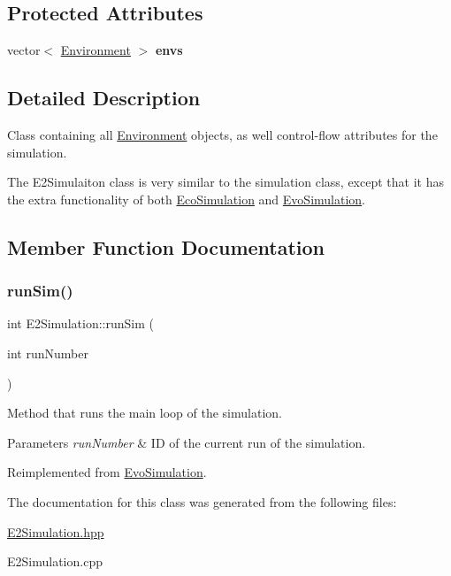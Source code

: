 \subsection*{Protected Attributes}
\begin{DoxyCompactItemize}
\item 
\mbox{\label{classE2Simulation_a72c3fa1a40648aeb904c6afb74dbb700}} 
vector$<$ \hyperlink{classEnvironment}{Environment} $>$ {\bfseries envs}
\end{DoxyCompactItemize}


\subsection{Detailed Description}
Class containing all \hyperlink{classEnvironment}{Environment} objects, as well control-\/flow attributes for the simulation. 

The E2\+Simulaiton class is very similar to the simulation class, except that it has the extra functionality of both \hyperlink{classEcoSimulation}{Eco\+Simulation} and \hyperlink{classEvoSimulation}{Evo\+Simulation}. 

\subsection{Member Function Documentation}
\mbox{\label{classE2Simulation_a28028881fd443d2445b562512cb2169c}} 
\subsubsection{\texorpdfstring{run\+Sim()}{runSim()}}
{\footnotesize\ttfamily int E2\+Simulation\+::run\+Sim (\begin{DoxyParamCaption}\item[{int}]{run\+Number }\end{DoxyParamCaption})\hspace{0.3cm}{\ttfamily [virtual]}}



Method that runs the main loop of the simulation. 


\begin{DoxyParams}{Parameters}
{\em run\+Number} & ID of the current run of the simulation. \\
\hline
\end{DoxyParams}


Reimplemented from \hyperlink{classEvoSimulation_aa43aa351dec24c638e56995a67a4f0f5}{Evo\+Simulation}.



The documentation for this class was generated from the following files\+:\begin{DoxyCompactItemize}
\item 
\hyperlink{E2Simulation_8hpp}{E2\+Simulation.\+hpp}\item 
E2\+Simulation.\+cpp\end{DoxyCompactItemize}
